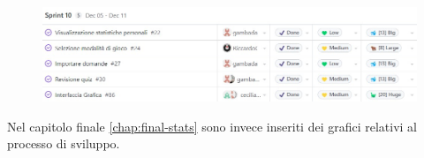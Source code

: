 \begin{figure}[H]
    \centering
    \includegraphics[width=\textwidth]{process/Img/sprint10.jpg}
    \label{fig:Sprint10}
\end{figure}

Nel capitolo finale \ref{chap:final-stats} sono invece inseriti dei grafici relativi al processo di sviluppo.